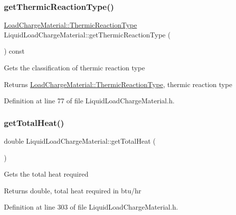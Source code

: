 \subsubsection{\texorpdfstring{get\+Thermic\+Reaction\+Type()}{getThermicReactionType()}\hspace{0.1cm}{\footnotesize\ttfamily [3/3]}}
{\footnotesize\ttfamily \hyperlink{namespace_load_charge_material_a51d4263e865a5d86236622dd3fe23fd1}{Load\+Charge\+Material\+::\+Thermic\+Reaction\+Type} Liquid\+Load\+Charge\+Material\+::get\+Thermic\+Reaction\+Type (\begin{DoxyParamCaption}{ }\end{DoxyParamCaption}) const\hspace{0.3cm}{\ttfamily [inline]}}

Gets the classification of thermic reaction type \begin{DoxyReturn}{Returns}
\hyperlink{namespace_load_charge_material_a51d4263e865a5d86236622dd3fe23fd1}{Load\+Charge\+Material\+::\+Thermic\+Reaction\+Type}, thermic reaction type 
\end{DoxyReturn}


Definition at line 77 of file Liquid\+Load\+Charge\+Material.\+h.

\mbox{\label{class_liquid_load_charge_material_a51a9826325e2c34cd073b8766331d476}} 
\subsubsection{\texorpdfstring{get\+Total\+Heat()}{getTotalHeat()}\hspace{0.1cm}{\footnotesize\ttfamily [1/3]}}
{\footnotesize\ttfamily double Liquid\+Load\+Charge\+Material\+::get\+Total\+Heat (\begin{DoxyParamCaption}{ }\end{DoxyParamCaption})\hspace{0.3cm}{\ttfamily [inline]}}

Gets the total heat required

\begin{DoxyReturn}{Returns}
double, total heat required in btu/hr 
\end{DoxyReturn}


Definition at line 303 of file Liquid\+Load\+Charge\+Material.\+h.

